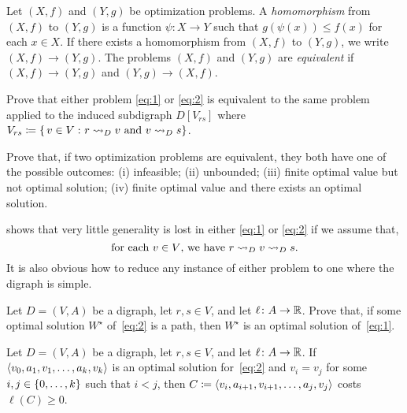\documentclass[10pt,reqno]{amsart}
\begin{document}
\begin{definition*}
  Let \((X,f)\) and \((Y,g)\) be optimization problems.  A
  \emph{homomorphism} from \((X,f)\) to \((Y,g)\) is a function
  \(\psi \colon X \to Y\) such that \(g(\psi(x)) \leq f(x)\) for each
  \(x \in X\).  If there exists a homomorphism from \((X,f)\) to
  \((Y,g)\), we write \((X,f) \to (Y,g)\).  The problems \((X,f)\) and
  \((Y,g)\) are \emph{equivalent} if \((X,f) \to (Y,g)\) and
  \((Y,g) \to (X,f)\).
\end{definition*}

\begin{exercise}
  \label{ex:1}
  Prove that either problem \eqref{eq:1} or \eqref{eq:2} is equivalent
  to the same problem applied to the induced subdigraph \(D[V_{rs}]\)
  where
  \(V_{rs} \coloneqq \{\,{v \in V}\,\colon{r \rightsquigarrow_D v \text{ and }v
    \rightsquigarrow_D s}\}\).
\end{exercise}

\begin{exercise}
  Prove that, if two optimization problems are equivalent, they both
  have one of the possible outcomes: (i) infeasible; (ii) unbounded;
  (iii) finite optimal value but not optimal solution; (iv) finite
  optimal value and there exists an optimal solution.
\end{exercise}

 shows that very little generality is lost in either
\eqref{eq:1} or \eqref{eq:2} if we assume that,
\begin{equation}
  \label{eq:3}
  \text{for each \(v \in V\), we have \(r \rightsquigarrow_D v \rightsquigarrow_D s\).}
\end{equation}
It is also obvious how to reduce any instance of either problem to one
where the digraph is simple.

\begin{exercise}
  \label{ex:2}
  Let \(D = (V,A)\) be a digraph, let \(r,s \in V\), and let
  \(\ell \colon A \to \mathbb{R}\).  Prove that, if some optimal solution
  \(W^\star\) of~\eqref{eq:2} is a path, then \(W^\star\) is an
  optimal solution of~\eqref{eq:1}.
\end{exercise}

\begin{exercise}
  \label{ex:3}
  Let \(D = (V,A)\) be a digraph, let \(r,s \in V\), and let
  \(\ell \colon A \to \mathbb{R}\).  If
  \(\langle v_0,a_1,v_1,\dotsc,a_k,v_k\rangle\) is an optimal solution
  for~\eqref{eq:2} and \(v_i = v_j\) for some
  \(i,j \in \{0,\dotsc,k\}\) such that \(i < j\), then
  \(C \coloneqq \langle v_i,a_{i+1},v_{i+1},\dotsc,a_j,v_j\rangle\) costs
  \(\ell(C) \geq 0\).
\end{exercise}
\end{document}
